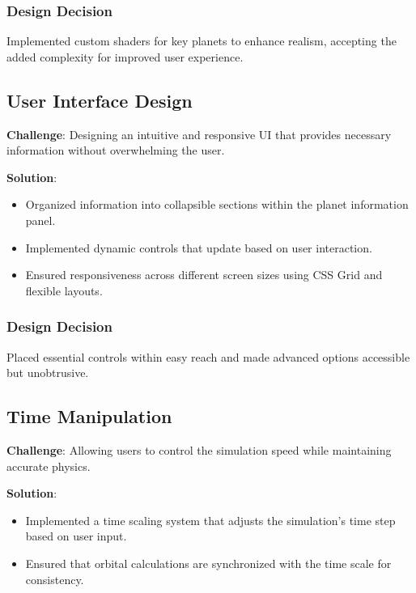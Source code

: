 \documentclass[12pt, a4paper]{article}
\begin{document}
\subsubsection{Design Decision}

Implemented custom shaders for key planets to enhance realism, accepting the
added complexity for improved user experience.

\subsection{User Interface Design}

\textbf{Challenge}: Designing an intuitive and responsive UI that provides necessary information without overwhelming the user.

\textbf{Solution}:

\begin{itemize}
    \item Organized information into collapsible sections within the planet information
          panel.
    \item Implemented dynamic controls that update based on user interaction.
    \item Ensured responsiveness across different screen sizes using CSS Grid and
          flexible layouts.
\end{itemize}

\subsubsection{Design Decision}

Placed essential controls within easy reach and made advanced options
accessible but unobtrusive.

\subsection{Time Manipulation}

\textbf{Challenge}: Allowing users to control the simulation speed while maintaining accurate physics.

\textbf{Solution}:

\begin{itemize}
    \item Implemented a time scaling system that adjusts the simulation's time step based
          on user input.
    \item Ensured that orbital calculations are synchronized with the time scale for
          consistency.
\end{itemize}
\end{document}
